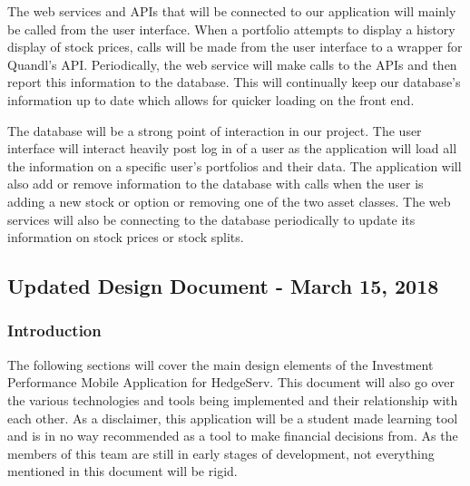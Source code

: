 \documentclass[onecolumn, draftclsnofoot,10pt, compsoc]{IEEEtran}
\begin{document}
    The web services and APIs that will be connected to our application will mainly be called from the user
    interface. When a portfolio attempts to display a history display of stock prices, calls will be made from the user
    interface to a wrapper for Quandl's API. Periodically, the web service will make calls to the APIs and 
    then report this information to the database. This will continually keep our database's information
    up to date which allows for quicker loading on the front end.
    
    The database will be a strong point of interaction in our project. The user interface will interact heavily
    post log in of a user as the application will load all the information on a specific user's portfolios and their
    data. The application will also add or remove information to the database with calls when the user is adding 
    a new stock or option or removing one of the two asset classes. The web services will also be connecting
    to the database periodically to update its information on stock prices or stock splits.

\newpage
\subsection{Updated Design Document - March 15, 2018}
\subsubsection{Introduction}

    The following sections will cover the main design elements of the Investment Performance Mobile
    Application for HedgeServ. This document will also go over the various technologies and tools being implemented and their
    relationship with each other. As a disclaimer, this application will be a student made learning tool and is in
    no way recommended as a tool  to make financial decisions from. As the members of this team are still in early stages of development,
    not everything mentioned in this document will be rigid. 
      
\end{document}
